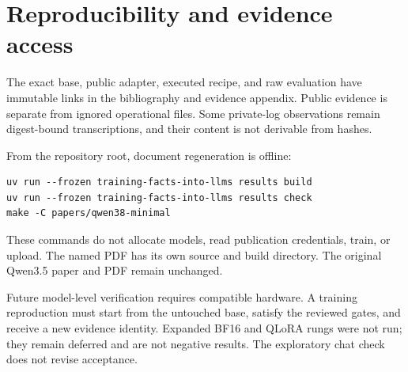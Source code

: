 \section{Reproducibility and evidence access}
\label{sec:reproducibility}
The exact base, public adapter, executed recipe, and raw evaluation have
immutable links in the bibliography and evidence appendix. Public evidence is
separate from ignored operational files. Some private-log observations remain
digest-bound transcriptions, and their content is not derivable from hashes.
\citep{qwen38,qwen38adapter,qwen38source}

From the repository root, document regeneration is offline:
\begin{verbatim}
uv run --frozen training-facts-into-llms results build
uv run --frozen training-facts-into-llms results check
make -C papers/qwen38-minimal
\end{verbatim}
These commands do not allocate models, read publication credentials, train, or
upload. The named PDF has its own source and build directory. The original
Qwen3.5 paper and PDF remain unchanged.

Future model-level verification requires compatible hardware. A training
reproduction must start from the untouched base, satisfy the reviewed gates,
and receive a new evidence identity. Expanded BF16 and QLoRA rungs were not
run; they remain deferred and are not negative results. The exploratory chat
check does not revise acceptance.
